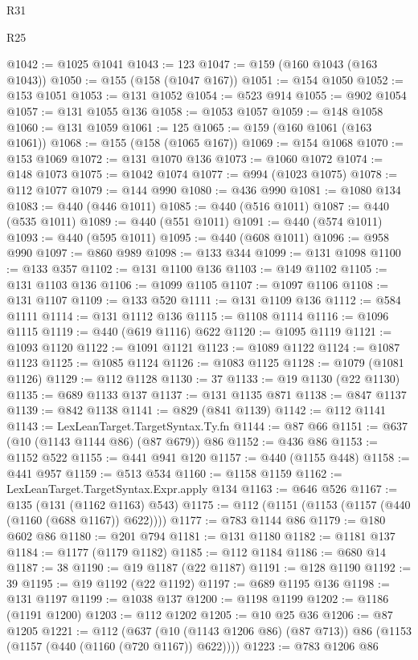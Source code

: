 \begin{lexlean}{R31}
\begin{lexlean}{R25}
\begin{coremodule}
{{{{{{{{{{{{{{{{{{{{{{{{{{{{{{{{{{{{{{{{{{{{{{{{{{{{{{{{{{{{{{{{{{{{{{{{{{{{{{{{{{{{{{{{{{{{{{{{{{{{{{{{{{{{{{{{{{{{{{{{{{{{{{{{{{{{{{{{{{{{{{{{{{{{{{{{{{{{{{{{{{{{{{{{{{{{{{{{{{{{{{{{{{{{{{{{{{{{{{{@1042 := @1025 @1041
@1043 := 123
@1047 := @159 (@160 @1043 (@163 @1043))
@1050 := @155 (@158 (@1047 @167))
@1051 := @154 @1050
@1052 := @153 @1051
@1053 := @131 @1052
@1054 := @523 @914
@1055 := @902 @1054
@1057 := @131 @1055 @136
@1058 := @1053 @1057
@1059 := @148 @1058
@1060 := @131 @1059
@1061 := 125
@1065 := @159 (@160 @1061 (@163 @1061))
@1068 := @155 (@158 (@1065 @167))
@1069 := @154 @1068
@1070 := @153 @1069
@1072 := @131 @1070 @136
@1073 := @1060 @1072
@1074 := @148 @1073
@1075 := @1042 @1074
@1077 := @994 (@1023 @1075)
@1078 := @112 @1077
@1079 := @144 @990
@1080 := @436 @990
@1081 := @1080 @134
@1083 := @440 (@446 @1011)
@1085 := @440 (@516 @1011)
@1087 := @440 (@535 @1011)
@1089 := @440 (@551 @1011)
@1091 := @440 (@574 @1011)
@1093 := @440 (@595 @1011)
@1095 := @440 (@608 @1011)
@1096 := @958 @990
@1097 := @860 @989
@1098 := @133 @344
@1099 := @131 @1098
@1100 := @133 @357
@1102 := @131 @1100 @136
@1103 := @149 @1102
@1105 := @131 @1103 @136
@1106 := @1099 @1105
@1107 := @1097 @1106
@1108 := @131 @1107
@1109 := @133 @520
@1111 := @131 @1109 @136
@1112 := @584 @1111
@1114 := @131 @1112 @136
@1115 := @1108 @1114
@1116 := @1096 @1115
@1119 := @440 (@619 @1116) @622
@1120 := @1095 @1119
@1121 := @1093 @1120
@1122 := @1091 @1121
@1123 := @1089 @1122
@1124 := @1087 @1123
@1125 := @1085 @1124
@1126 := @1083 @1125
@1128 := @1079 (@1081 @1126)
@1129 := @112 @1128
@1130 := 37
@1133 := @19 @1130 (@22 @1130)
@1135 := @689 @1133 @137
@1137 := @131 @1135 @871
@1138 := @847 @1137
@1139 := @842 @1138
@1141 := @829 (@841 @1139)
@1142 := @112 @1141
@1143 := LexLeanTarget.TargetSyntax.Ty.fn
@1144 := @87 @66
@1151 := @637 (@10 (@1143 @1144 @86) (@87 @679)) @86
@1152 := @436 @86
@1153 := @1152 @522
@1155 := @441 @941 @120
@1157 := @440 (@1155 @448)
@1158 := @441 @957
@1159 := @513 @534
@1160 := @1158 @1159
@1162 := LexLeanTarget.TargetSyntax.Expr.apply @134
@1163 := @646 @526
@1167 := @135 (@131 (@1162 @1163) @543)
@1175 := @112 (@1151 (@1153 (@1157 (@440 (@1160 (@688 @1167)) @622))))
@1177 := @783 @1144 @86
@1179 := @180 @602 @86
@1180 := @201 @794
@1181 := @131 @1180
@1182 := @1181 @137
@1184 := @1177 (@1179 @1182)
@1185 := @112 @1184
@1186 := @680 @14
@1187 := 38
@1190 := @19 @1187 (@22 @1187)
@1191 := @128 @1190
@1192 := 39
@1195 := @19 @1192 (@22 @1192)
@1197 := @689 @1195 @136
@1198 := @131 @1197
@1199 := @1038 @137
@1200 := @1198 @1199
@1202 := @1186 (@1191 @1200)
@1203 := @112 @1202
@1205 := @10 @25 @36
@1206 := @87 @1205
@1221 := @112
    (@637 (@10 (@1143 @1206 @86) (@87 @713)) @86 (@1153 (@1157 (@440 (@1160 (@720 @1167)) @622))))
@1223 := @783 @1206 @86
}}}}}}}}}}}}}}}}}}}}}}}}}}}}}}}}}}}}}}}}}}}}}}}}}}}}}}}}}}}}}}}}}}}}}}}}}}}}}}}}}}}}}}}}}}}}}}}}}}}}}}}}}}}}}}}}}}}}}}}}}}}}}}}}}}}}}}}}}}}}}}}}}}}}}}}}}}}}}}}}}}}}}}}}}}}}}}}}}}}}}}}}}}}}}}}}}}}}}}}
\end{coremodule}
\end{lexlean}
\end{lexlean}
